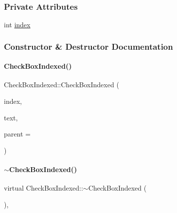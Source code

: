 \subsubsection*{Private Attributes}
\begin{DoxyCompactItemize}
\item 
int \mbox{\hyperlink{classCheckBoxIndexed_a044019936afecec6b18af69da0bf7c41}{index}}
\end{DoxyCompactItemize}


\subsubsection{Constructor \& Destructor Documentation}
\mbox{\label{classCheckBoxIndexed_a05d9d0ecbdfd394db281bdcfe256fb46}} 
\paragraph{\texorpdfstring{Check\+Box\+Indexed()}{CheckBoxIndexed()}}
{\footnotesize\ttfamily Check\+Box\+Indexed\+::\+Check\+Box\+Indexed (\begin{DoxyParamCaption}\item[{int}]{index,  }\item[{Q\+String}]{text,  }\item[{Q\+Widget $\ast$}]{parent = {} }\end{DoxyParamCaption})\hspace{0.3cm}{\ttfamily [inline]}}

\mbox{\label{classCheckBoxIndexed_a2966a555ec25ced314dcc10b54ca6c54}} 
\paragraph{\texorpdfstring{$\sim$\+Check\+Box\+Indexed()}{~CheckBoxIndexed()}}
{\footnotesize\ttfamily virtual Check\+Box\+Indexed\+::$\sim$\+Check\+Box\+Indexed (\begin{DoxyParamCaption}{ }\end{DoxyParamCaption})\hspace{0.3cm}{\ttfamily [inline]}, {\ttfamily [virtual]}}



